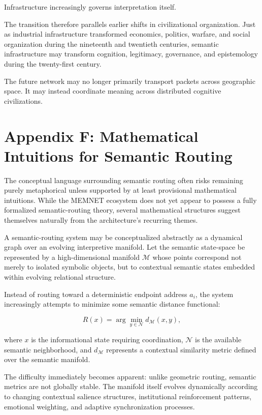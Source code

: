 \documentclass[11pt,a4paper]{article}
\begin{document}
Infrastructure increasingly governs interpretation itself.

The transition therefore parallels earlier shifts in civilizational organization. Just as industrial infrastructure transformed economics, politics, warfare, and social organization during the nineteenth and twentieth centuries, semantic infrastructure may transform cognition, legitimacy, governance, and epistemology during the twenty-first century.

The future network may no longer primarily transport packets across geographic space. It may instead coordinate meaning across distributed cognitive civilizations.

\section{Appendix F: Mathematical Intuitions for Semantic Routing}

The conceptual language surrounding semantic routing often risks remaining purely metaphorical unless supported by at least provisional mathematical intuitions. While the MEMNET ecosystem does not yet appear to possess a fully formalized semantic-routing theory, several mathematical structures suggest themselves naturally from the architecture's recurring themes.

A semantic-routing system may be conceptualized abstractly as a dynamical graph over an evolving interpretive manifold. Let the semantic state-space be represented by a high-dimensional manifold $\mathcal{M}$ whose points correspond not merely to isolated symbolic objects, but to contextual semantic states embedded within evolving relational structure.

Instead of routing toward a deterministic endpoint address $a_i$, the system increasingly attempts to minimize some semantic distance functional:

\[
R(x) = \arg\min_{y \in \mathcal{N}} d_{\mathcal{M}}(x,y),
\]

where $x$ is the informational state requiring coordination, $\mathcal{N}$ is the available semantic neighborhood, and $d_{\mathcal{M}}$ represents a contextual similarity metric defined over the semantic manifold.

The difficulty immediately becomes apparent: unlike geometric routing, semantic metrics are not globally stable. The manifold itself evolves dynamically according to changing contextual salience structures, institutional reinforcement patterns, emotional weighting, and adaptive synchronization processes.
\end{document}
